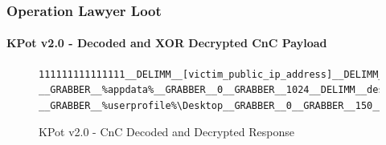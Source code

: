 \documentclass[aspectratio=169]{beamer}
\begin{document}
{
\begin{frame}[fragile]
  \frametitle{Operation Lawyer Loot}
  \framesubtitle{KPot v2.0 - Decoded and XOR Decrypted CnC
    Payload}
\begin{figure}
\scriptsize{
\begin{verbatim}
111111111111111__DELIMM__[victim_public_ip_address]__DELIMM__appdata__GRABBER__*.log,*.txt,
__GRABBER__%appdata%__GRABBER__0__GRABBER__1024__DELIMM__desktop_txt__GRABBER__*.txt,
__GRABBER__%userprofile%\Desktop__GRABBER__0__GRABBER__150__DELIMM____DELIMM____DELIMM__
\end{verbatim}
}
\caption{KPot v2.0 - CnC Decoded and Decrypted Response}
\end{figure}
\end{frame}
}
\end{document}
